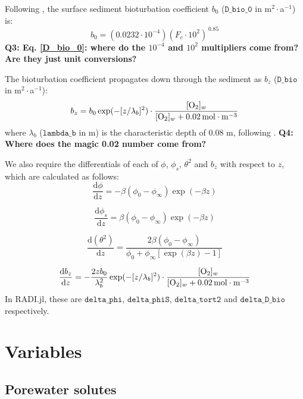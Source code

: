 \documentclass[a4paper]{article}
\newcommand{\D}[1]{\mathrm{d}#1}
\newcommand{\code}[1]{\texttt{#1}}
\newcommand{\molmmm}{\mathrm{mol}\cdot\mathrm{m}^{-3}}
\newcommand{\wtf}[1]{\textcolor{Cerulean}{\textbf{#1}}}
\begin{document}
Following \citet{archer_model_2002}, the surface sediment bioturbation coefficient $b_0$ ($\code{D\_bio\_0}$ in m$^2\cdot$a$^{-1}$) is:
\begin{equation}\label{D_bio_0}
b_0 = (0.0232 \cdot 10^{-4}) (F_c \cdot 10^2)^{\,0.85}
\end{equation}
\wtf{Q3: Eq. \eqref{D_bio_0}: where do the $10^{-4}$ and $10^2$ multipliers come from? Are they just unit conversions?}

The bioturbation coefficient propagates down through the sediment as $b_z$ ($\code{D\_bio}$ in m$^2\cdot$a$^{-1}$):
\begin{equation}\label{B_z}
b_z = b_0 \exp(-[z/\lambda_b]^2) \cdot \frac{[\ce{O2}]_w}{[\ce{O2}]_w + 0.02 \, \molmmm}
\end{equation}
where $\lambda_b$ ($\code{lambda\_b}$ in m) is the characteristic depth of 0.08 m, following \citet{sayles_benthic_2001}. \wtf{Q4: Where does the magic 0.02 number come from?}

We also require the differentials of each of $\phi$, $\phi_s$, $\theta^2$ and $b_z$ with respect to $z$, which are calculated as follows:
\begin{equation}
\frac{\D{\phi}}{\D{z}} = -\beta (\phi_0 - \phi_\infty) \exp (-\beta z)
\end{equation}

\begin{equation}
\frac{\D{\phi_s}}{\D{z}} = \beta (\phi_0 - \phi_\infty) \exp (-\beta z)
\end{equation}

\begin{equation}
\frac{\D{(\theta^2)}}{\D{z}} = \frac{2 \beta (\phi_0 - \phi_\infty)}{\phi_0 + \phi_\infty [\exp(\beta z) - 1]}
\end{equation}

\begin{equation}
\frac{\D{b_z}}{\D{z}} = - \frac{2 z b_0}{\lambda_b^2} \exp(-[z/\lambda_b]^2) \cdot \frac{[\ce{O2}]_w}{[\ce{O2}]_w + 0.02 \, \molmmm}
\end{equation}
In RADI.jl, these are $\code{delta\_phi}$, $\code{delta\_phiS}$, $\code{delta\_tort2}$ and $\code{delta\_D\_bio}$ respectively.

\section{Variables}

\subsection{Porewater solutes}
\end{document}
